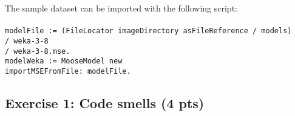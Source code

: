 \documentclass [11pt, a4wide, twoside]{article}
\begin{document}
\noindent The sample dataset can be imported with the following script:\\\\
\texttt{modelFile := (FileLocator imageDirectory asFileReference / \textquotesingle models\textquotesingle)\\
\hspace*{0.5cm}/ \textquotesingle weka-3-8\textquotesingle\\
\hspace*{0.5cm}/ \textquotesingle weka-3-8.mse\textquotesingle.\\
modelWeka := MooseModel new\\
\hspace*{0.5cm}importMSEFromFile: modelFile.}

\newpage

\subsection*{Exercise 1: Code smells (4 pts)}
\end{document}

